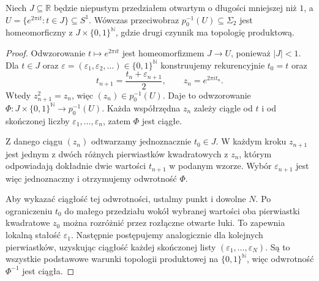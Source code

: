 \begin{lemat}
\label{lem:topog25-solenoid-local}
Niech \(J\subseteq\mathbb R\)
będzie niepustym przedziałem otwartym
o długości mniejszej niż \(1\),
a \(U=\{e^{2\pi it}:t\in J\}\subseteq S^1\).
Wówczas przeciwobraz
\(p_0^{-1}(U)\subseteq\Sigma_2\)
jest homeomorficzny z
\(J\times\{0,1\}^{\mathbb N}\),
gdzie drugi czynnik ma topologię produktową.
\end{lemat}
\begin{proof}
Odwzorowanie
\(t\mapsto e^{2\pi it}\)
jest homeomorfizmem \(J\to U\),
ponieważ \(|J|<1\).
Dla \(t\in J\) oraz
\(\varepsilon=(\varepsilon_1,\varepsilon_2,\ldots)
\in\{0,1\}^{\mathbb N}\)
konstruujemy rekurencyjnie
\(t_0=t\) oraz
\[
 t_{n+1}=\frac{t_n+\varepsilon_{n+1}}{2},
 \qquad z_n=e^{2\pi it_n}.
\]
Wtedy \(z_{n+1}^2=z_n\),
więc \((z_n)\in p_0^{-1}(U)\).
Daje to odwzorowanie
\(\Phi\colon J\times\{0,1\}^{\mathbb N}
\to p_0^{-1}(U)\).
Każda współrzędna \(z_n\)
zależy ciągle od \(t\)
i od skończonej liczby
\(\varepsilon_1,\ldots,\varepsilon_n\),
zatem \(\Phi\) jest ciągłe.

Z danego ciągu \((z_n)\)
odtwarzamy jednoznacznie \(t_0\in J\).
W każdym kroku \(z_{n+1}\)
jest jednym z dwóch różnych
pierwiastków kwadratowych z \(z_n\),
którym odpowiadają dokładnie
dwie wartości \(t_{n+1}\)
w podanym wzorze.
Wybór \(\varepsilon_{n+1}\)
jest więc jednoznaczny
i otrzymujemy odwrotność \(\Phi\).

Aby wykazać ciągłość tej odwrotności,
ustalmy punkt i dowolne \(N\).
Po ograniczeniu \(t_0\)
do małego przedziału wokół
wybranej wartości oba pierwiastki
kwadratowe \(z_0\) można rozróżnić
przez rozłączne otwarte łuki.
To zapewnia lokalną stałość
\(\varepsilon_1\).
Następnie postępujemy analogicznie
dla kolejnych pierwiastków,
uzyskując ciągłość każdej
skończonej listy
\((\varepsilon_1,\ldots,\varepsilon_N)\).
Są to wszystkie podstawowe warunki
topologii produktowej
na \(\{0,1\}^{\mathbb N}\),
więc odwrotność \(\Phi^{-1}\)
jest ciągła.
\end{proof}

